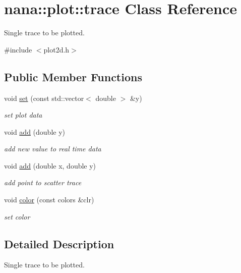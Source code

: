 \hypertarget{classnana_1_1plot_1_1trace}{\section{nana\-:\-:plot\-:\-:trace Class Reference}
\label{classnana_1_1plot_1_1trace}
}


Single trace to be plotted.  




{\ttfamily \#include $<$plot2d.\-h$>$}

\subsection*{Public Member Functions}
\begin{DoxyCompactItemize}
\item 
void \hyperlink{classnana_1_1plot_1_1trace_a681d2e5d8d335e7785b30ce9d5548bf5}{set} (const std\-::vector$<$ double $>$ \&y)
\begin{DoxyCompactList}\small\item\em set plot data \end{DoxyCompactList}\item 
void \hyperlink{classnana_1_1plot_1_1trace_a183d7b46d2af84c0baec752ecfe668dc}{add} (double y)
\begin{DoxyCompactList}\small\item\em add new value to real time data \end{DoxyCompactList}\item 
void \hyperlink{classnana_1_1plot_1_1trace_a7832bca87472ab44fd382f3eaa6cb17d}{add} (double x, double y)
\begin{DoxyCompactList}\small\item\em add point to scatter trace \end{DoxyCompactList}\item 
\hypertarget{classnana_1_1plot_1_1trace_a093e666f7ab2f6a044b9d02edb6f7c75}{void \hyperlink{classnana_1_1plot_1_1trace_a093e666f7ab2f6a044b9d02edb6f7c75}{color} (const colors \&clr)}\label{classnana_1_1plot_1_1trace_a093e666f7ab2f6a044b9d02edb6f7c75}

\begin{DoxyCompactList}\small\item\em set color \end{DoxyCompactList}\end{DoxyCompactItemize}


\subsection{Detailed Description}
Single trace to be plotted. 

